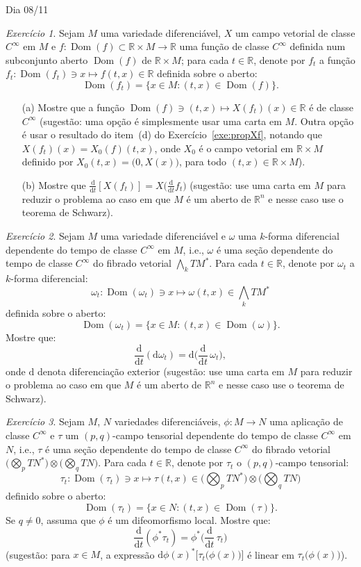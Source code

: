 \documentclass[oneside,11pt]{amsart}
\newcommand{\R}{\mathds R}
\newcommand{\dd}{\mathrm d}
\DeclareMathOperator{\Dom}{Dom}
\theoremstyle{remark}\newtheorem{exercise}{Exercício}[section]
\theoremstyle{plain}\newtheorem{teo}{Teorema}[section]
\theoremstyle{plain}\newtheorem{lem}[teo]{Lema}
\theoremstyle{plain}\newtheorem{prop}[teo]{Proposição}
\theoremstyle{definition}\newtheorem{defin}[teo]{Definição}
\theoremstyle{remark}\newtheorem{rem}[teo]{Observação}
\theoremstyle{definition}\newtheorem{example}[teo]{Exemplo}
\numberwithin{equation}{section}
\begin{document}
\begin{section}{Dia 08/11}
\begin{exercise}\label{exe:ddtXft}
Sejam $M$ uma variedade diferenciável, $X$ um campo vetorial de classe $C^\infty$ em $M$ e $f:\Dom(f)\subset\R\times M\to\R$ uma função de classe $C^\infty$
definida num subconjunto aberto $\Dom(f)$ de $\R\times M$; para cada $t\in\R$, denote por $f_t$ a função $f_t:\Dom(f_t)\ni x\mapsto f(t,x)\in\R$ definida
sobre o aberto:
\[\Dom(f_t)=\big\{x\in M:(t,x)\in\Dom(f)\big\}.\]
\begin{itemize}
\item[(a)] Mostre que a função $\Dom(f)\ni(t,x)\mapsto X(f_t)(x)\in\R$ é de classe $C^\infty$ (sugestão: uma opção é simplesmente usar uma carta em $M$.
Outra opção é usar o resultado do item~(d) do Exercício~\ref{exe:propXf}, notando que $X(f_t)(x)=X_0(f)(t,x)$, onde $X_0$ é o campo vetorial em $\R\times M$ definido
por $X_0(t,x)=\big(0,X(x)\big)$, para todo $(t,x)\in\R\times M$).
\item[(b)] Mostre que $\frac{\dd}{\dd t}[X(f_t)]=X\big(\frac{\dd}{\dd t}f_t\big)$ (sugestão: use uma carta em $M$ para reduzir o problema
ao caso em que $M$ é um aberto de $\R^n$ e nesse caso use o teorema de Schwarz).
\end{itemize}
\end{exercise}

\begin{exercise}\label{exe:dddtomegat}
Sejam $M$ uma variedade diferenciável e $\omega$ uma $k$-forma diferencial dependente do tempo de classe $C^\infty$ em $M$, i.e., $\omega$ é uma seção
dependente do tempo de classe $C^\infty$ do fibrado vetorial $\bigwedge_kTM^*$. Para cada $t\in\R$, denote por $\omega_t$ a $k$-forma diferencial:
\[\omega_t:\Dom(\omega_t)\ni x\longmapsto\omega(t,x)\in\bigwedge_kTM^*\]
definida sobre o aberto:
\[\Dom(\omega_t)=\big\{x\in M:(t,x)\in\Dom(\omega)\big\}.\]
Mostre que:
\[\frac{\dd}{\dd t}(\dd\omega_t)=\dd\Big(\frac{\dd}{\dd t}\,\omega_t\Big),\]
onde $\dd$ denota diferenciação exterior (sugestão: use uma carta em $M$ para reduzir o problema
ao caso em que $M$ é um aberto de $\R^n$ e nesse caso use o teorema de Schwarz).
\end{exercise}

\begin{exercise}\label{exe:ddtpullback}
Sejam $M$, $N$ variedades diferenciáveis, $\phi:M\to N$ uma aplicação de classe $C^\infty$ e $\tau$ um $(p,q)$-campo tensorial
dependente do tempo de classe $C^\infty$ em $N$, i.e., $\tau$ é uma seção dependente do tempo de classe $C^\infty$
do fibrado vetorial $\big(\bigotimes_pTN^*\big)\otimes\big(\bigotimes_qTN\big)$. Para cada $t\in\R$, denote por $\tau_t$ o
$(p,q)$-campo tensorial:
\[\tau_t:\Dom(\tau_t)\ni x\longmapsto\tau(t,x)\in\Big(\bigotimes_pTN^*\Big)\otimes\Big(\bigotimes_qTN\Big)\]
definido sobre o aberto:
\[\Dom(\tau_t)=\big\{x\in N:(t,x)\in\Dom(\tau)\big\}.\]
Se $q\ne0$, assuma que $\phi$ é um difeomorfismo local.
Mostre que:
\[\frac{\dd}{\dd t}(\phi^*\tau_t)=\phi^*\Big(\frac{\dd}{\dd t}\,\tau_t\Big)\]
(sugestão: para $x\in M$, a expressão $\dd\phi(x)^*\big[\tau_t\big(\phi(x)\big)\big]$ é linear em $\tau_t\big(\phi(x)\big)$).
\end{exercise}


\end{section}
\end{document}
